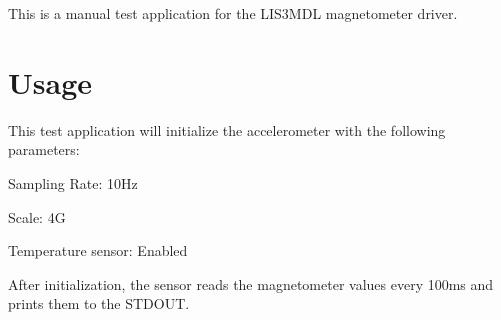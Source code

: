 This is a manual test application for the L\+I\+S3\+M\+DL magnetometer driver.

\section*{Usage}

This test application will initialize the accelerometer with the following parameters\+:
\begin{DoxyItemize}
\item Sampling Rate\+: 10\+Hz
\item Scale\+: 4G
\item Temperature sensor\+: Enabled
\end{DoxyItemize}

After initialization, the sensor reads the magnetometer values every 100ms and prints them to the S\+T\+D\+O\+UT. 